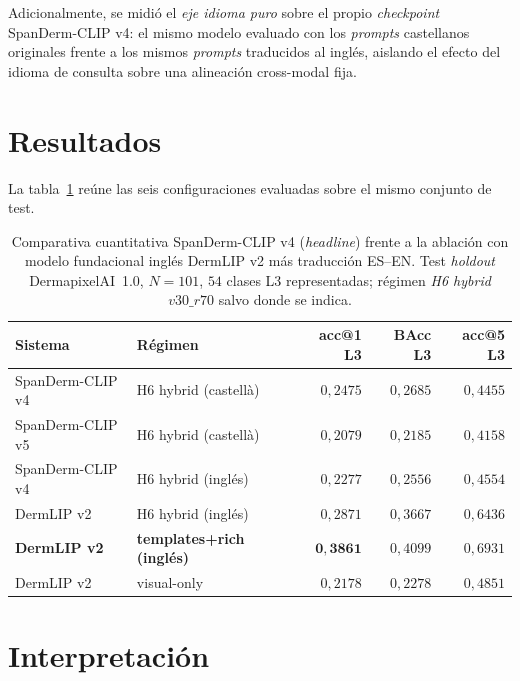 Adicionalmente, se midió el \emph{eje idioma puro} sobre el propio
\emph{checkpoint} SpanDerm-CLIP v4: el mismo modelo evaluado con
los \emph{prompts} castellanos originales frente a los mismos
\emph{prompts} traducidos al inglés, aislando el efecto del idioma
de consulta sobre una alineación cross-modal fija.

\section{Resultados}
\label{sec:anexoi-resultados}

La tabla~\ref{tab:ablation_panderm_en} reúne las seis
configuraciones evaluadas sobre el mismo conjunto de test.

\begin{table}[H]
\centering
\footnotesize
\setlength{\tabcolsep}{4pt}
\renewcommand{\arraystretch}{0.95}
\caption{Comparativa cuantitativa SpanDerm-CLIP v4 (\emph{headline})
frente a la ablación con modelo fundacional inglés DermLIP v2 más
traducción ES--EN. Test \emph{holdout} DermapixelAI~1.0,
$N = 101$, $54$ clases L3 representadas; régimen \emph{H6 hybrid}
$v30\_r70$ salvo donde se indica.}
\label{tab:ablation_panderm_en}
\begin{tabular}{llrrr}
\hline
Sistema & Régimen & acc@1 L3 & BAcc L3 & acc@5 L3 \\
\hline
SpanDerm-CLIP v4    & H6 hybrid (castellà)            & $0{,}2475$          & $0{,}2685$ & $0{,}4455$ \\
SpanDerm-CLIP v5    & H6 hybrid (castellà)            & $0{,}2079$          & $0{,}2185$ & $0{,}4158$ \\
SpanDerm-CLIP v4    & H6 hybrid (inglés)              & $0{,}2277$          & $0{,}2556$ & $0{,}4554$ \\
DermLIP v2          & H6 hybrid (inglés)              & $0{,}2871$          & $0{,}3667$ & $0{,}6436$ \\
\textbf{DermLIP v2} & \textbf{templates+rich (inglés)} & $\mathbf{0{,}3861}$ & $0{,}4099$ & $0{,}6931$ \\
DermLIP v2          & visual-only                     & $0{,}2178$          & $0{,}2278$ & $0{,}4851$ \\
\hline
\end{tabular}
\end{table}

\section{Interpretación}
\label{sec:anexoi-interpretacion}

